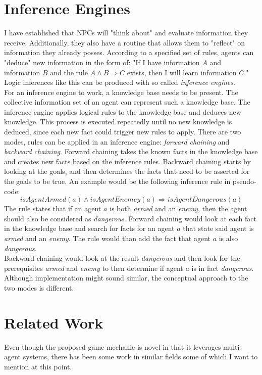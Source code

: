 \section{Inference Engines}
I have established that NPCs will "think about" and evaluate information they receive. Additionally, they also have a routine that allows them to "reflect" on information they already posses. According to a specified set of rules, agents can "deduce" new information in the form of: "If I have information $A$ and information $B$ and the rule $A \wedge B \Rightarrow C$ exists, then I will learn information $C$." Logic inferences like this can be produced with so called \textit{inference engines}.~\cite{Hayes1983}\\
For an inference engine to work, a knowledge base needs to be present. The collective information set of an agent can represent such a knowledge base. The inference engine applies logical rules to the knowledge base and deduces new knowledge. This process is executed repeatedly until no new knowledge is deduced, since each new fact could trigger new rules to apply. There are two modes, rules can be applied in an inference engine: \textit{forward chaining} and \textit{backward chaining}. Forward chaining takes the known facts in the knowledge base and creates new facts based on the inference rules. Backward chaining starts by looking at the goals, and then determines the facts that need to be asserted for the goals to be true. An example would be the following inference rule in pseudo-code:
\begin{equation}
	\textit{isAgentArmed}(a) \wedge \textit{isAgentEnemey}(a) \Rightarrow \textit{isAgentDangerous}(a)
\end{equation}
The rule states that if an agent $a$ is both \textit{armed} and an \textit{enemy}, then the agent should also be considered as \textit{dangerous}. Forward chaining would look at each fact in the knowledge base and search for facts for an agent $a$ that state said agent is \textit{armed} and an \textit{enemy}. The rule would than add the fact that agent $a$ is also \textit{dangerous}.\\
Backward-chaining would look at the result \textit{dangerous} and then look for the prerequisites \textit{armed} and \textit{enemy} to then determine if agent $a$ is in fact \textit{dangerous}. Although implementation might sound similar, the conceptual approach to the two modes is different.~\cite{Feigenbaum1981}
\section{Related Work}
Even though the proposed game mechanic is novel in that it leverages multi-agent systems, there has been some work in similar fields some of which I want to mention at this point.
